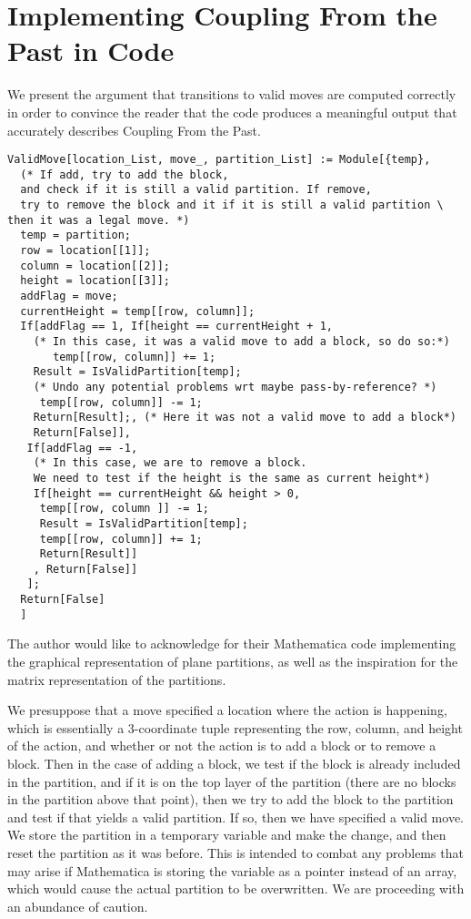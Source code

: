 \section{Implementing Coupling From the Past in Code}\label{code}
We present the argument that transitions to valid moves are computed correctly in order to convince the reader that the code produces a meaningful output that accurately describes Coupling From the Past.
\begin{verbatim}
ValidMove[location_List, move_, partition_List] := Module[{temp},
  (* If add, try to add the block, 
  and check if it is still a valid partition. If remove, 
  try to remove the block and it if it is still a valid partition \
then it was a legal move. *)
  temp = partition;
  row = location[[1]];
  column = location[[2]];
  height = location[[3]];
  addFlag = move;
  currentHeight = temp[[row, column]];
  If[addFlag == 1, If[height == currentHeight + 1,
    (* In this case, it was a valid move to add a block, so do so:*)
       temp[[row, column]] += 1;
    Result = IsValidPartition[temp];
    (* Undo any potential problems wrt maybe pass-by-reference? *)
     temp[[row, column]] -= 1;
    Return[Result];, (* Here it was not a valid move to add a block*)
    Return[False]],
   If[addFlag == -1,
    (* In this case, we are to remove a block. 
    We need to test if the height is the same as current height*)
    If[height == currentHeight && height > 0,
     temp[[row, column ]] -= 1;
     Result = IsValidPartition[temp];
     temp[[row, column]] += 1;
     Return[Result]]
    , Return[False]]
   ];
  Return[False]
  ] 
\end{verbatim}
The author would like to acknowledge \cite{Weisstein} for their Mathematica code implementing the graphical representation of plane partitions, as well as the inspiration for the matrix representation of the partitions.


We presuppose that a move specified a location where the action is happening, which is essentially a 3-coordinate tuple representing the row, column, and height of the action, and whether or not the action is to add a block or to remove a block. Then in the case of adding a block, we test if the block is already included in the partition, and if it is on the top layer of the partition (there are no blocks in the partition above that point), then we try to add the block to the partition and test if that yields a valid partition. If so, then we have specified a valid move. We store the partition in a temporary variable and make the change, and then reset the partition as it was before. This is intended to combat any problems that may arise if Mathematica is storing the variable as a pointer instead of an array, which would cause the actual partition to be overwritten. We are proceeding with an abundance of caution.

